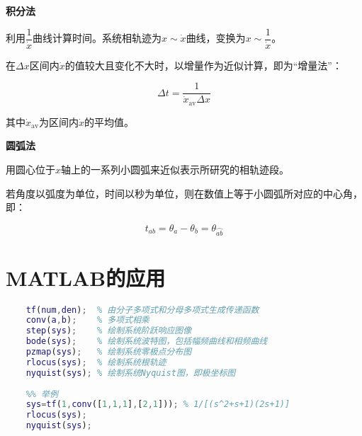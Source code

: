 \documentclass[cn, blue, normal, 12pt]{elegantnote}
\begin{document}
\textbf{积分法}

利用$\dfrac{1}{\dot{x}}$曲线计算时间。系统相轨迹为$x\sim \dot{x}$曲线，变换为$x\sim \dfrac{1}{\dot{x}}$。

在$\Delta x$区间内$\dot{x}$的值较大且变化不大时，以增量作为近似计算，即为“增量法”：

\begin{equation}
    \Delta t=\frac{1}{\dot{x}_{\mathrm{av}}\Delta x}
\end{equation}

其中$\dot{x}_{\mathrm{av}}$为区间内$\dot{x}$的平均值。

\textbf{圆弧法}

用圆心位于$x$轴上的一系列小圆弧来近似表示所研究的相轨迹段。

若角度以弧度为单位，时间以秒为单位，则在数值上等于小圆弧所对应的中心角，即：

\begin{equation}
    t_{ab}=\theta_a-\theta_b=\theta_{\wideparen{ab}}
\end{equation}

\newpage

\section{MATLAB的应用}

\begin{lstlisting}[language=Matlab]
    %% 需要掌握的函数
    tf(num,den);  % 由分子多项式和分母多项式生成传递函数
    conv(a,b);    % 多项式相乘
    step(sys);    % 绘制系统阶跃响应图像
    bode(sys);    % 绘制系统波特图，包括幅频曲线和相频曲线
    pzmap(sys);   % 绘制系统零极点分布图
    rlocus(sys);  % 绘制系统根轨迹
    nyquist(sys); % 绘制系统Nyquist图，即极坐标图
    
    %% 举例
    sys=tf(1,conv([1,1,1],[2,1])); % 1/[(s^2+s+1)(2s+1)]
    rlocus(sys);
    nyquist(sys);
\end{lstlisting}
\end{document}
